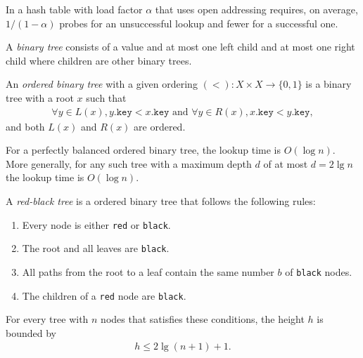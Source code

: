 \documentclass{article}
\begin{document}
\begin{proposition}
	In a hash table with load factor $\alpha$ that uses open addressing requires, on average, $1/(1-\alpha)$ 
	probes for an unsuccessful lookup and fewer for a successful one.
\end{proposition}
\begin{definition}
	A \emph{binary tree} consists of a value and at most one left child and at most one right child where
	children are other binary trees.
\end{definition}
\begin{definition}
	An \emph{ordered binary tree} with a given ordering $(<) : X\times X \to \{0, 1\}$ is a binary tree 
	with a root $x$ such that
	\begin{align*}
		\forall y \in L(x), y.\texttt{key} < x.\texttt{key} 
		\text{ and } \forall y \in R(x), x.\texttt{key} < y.\texttt{key},
	\end{align*}
	and both $L(x)$ and $R(x)$ are ordered.
\end{definition}

\begin{proposition}
	For a perfectly balanced ordered binary tree, the lookup time is $O(\log n)$.\\
	More generally, for any such tree with a maximum depth $d$ of at most $d=2 \lg n$ the
	lookup time is $O(\log n)$.
\end{proposition}

\begin{theorem}[L9]
	A \emph{red-black tree} is a ordered binary tree that follows the
	following rules:
	\begin{enumerate}
		\item Every node is either \texttt{red} or \texttt{black}.
		\item The root and all leaves are \texttt{black}.
		\item All paths from the root to a leaf contain the same number $b$ of \texttt{black} nodes.
		\item The children of a \texttt{red} node are \texttt{black}.
	\end{enumerate}
	For every tree with $n$ nodes that satisfies these conditions, 
	the height $h$ is bounded by
	\begin{align*}
		h\leq 2\lg(n+1)+1.
	\end{align*}
\end{theorem}
\end{document}
